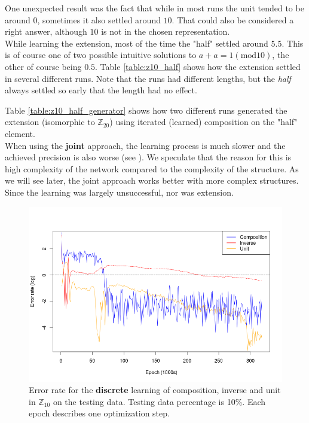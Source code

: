One unexpected result was the fact that while in most runs the unit tended to be around $0$, sometimes it also settled around $10$. That could also be considered a right answer, although $10$ is not in the chosen representation.\\

While learning the extension, most of the time the "half" settled around $5.5$. This is of course one of two possible intuitive solutions to $a+a=1(\text{mod} 10)$, the other of course being $0.5$. Table \ref{table:z10_half} shows how the extension settled in several different runs. Note that the runs had different lengths, but the \textit{half} always settled so early that the length had no effect.

Table \ref{table:z10_half_generator} shows how two different runs generated the extension (isomorphic to $\mathbb{Z}_{20}$) using iterated (learned) composition on the "half" element.\\

When using the \textbf{joint} approach, the learning process is much slower and the achieved precision is also worse (see ). We speculate that the reason for this is high complexity of the network compared to the complexity of the structure. As we will see later, the joint approach works better with more complex structures. Since the learning was largely unsuccessful, nor was extension.

\begin{figure}[b]
\caption{Error rate for the \textbf{discrete} learning of composition, inverse and unit in $\mathbb{Z}_{10}$ on the testing data. Testing data percentage is 10\%. Each epoch describes one optimization step.}
\label{graph:z10_90percent}
\includegraphics[width=\linewidth]{../img/z10_90percent.png}
\end{figure}

